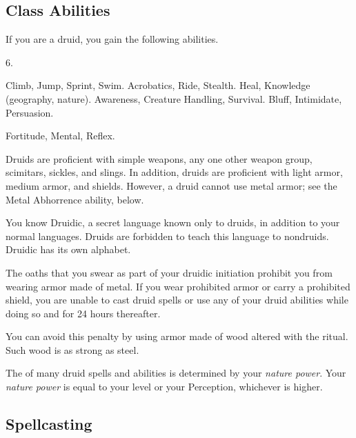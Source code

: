     \subsection{Class Abilities}
        If you are a druid, you gain the following abilities.

         6.

         Climb, Jump, Sprint, Swim.
         Acrobatics, Ride, Stealth.
         Heal, Knowledge (geography, nature).
         Awareness, Creature Handling, Survival.
         Bluff, Intimidate, Persuasion.

          Fortitude,  Mental,  Reflex.

        Druids are proficient with simple weapons, any one other weapon group, scimitars, sickles, and slings.
        In addition, druids are proficient with light armor, medium armor, and shields.
        However, a druid cannot use metal armor; see the Metal Abhorrence ability, below.

        You know Druidic, a secret language known only to druids, in addition to your normal languages.
        Druids are forbidden to teach this language to nondruids.
        Druidic has its own alphabet.

        The oaths that you swear as part of your druidic initiation prohibit you from wearing armor made of metal.
        If you wear prohibited armor or carry a prohibited shield, you are unable to cast druid spells or use any of your  druid abilities while doing so and for 24 hours thereafter.
        
        You can avoid this penalty by using armor made of wood altered with the  ritual.
        Such wood is as strong as steel.

        The  of many druid spells and abilities is determined by your \textit{nature power}.
        Your \textit{nature power} is equal to your level or your Perception, whichever is higher.

        \subsection{Spellcasting}

